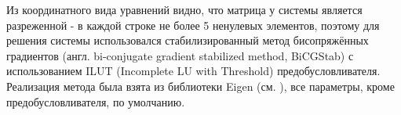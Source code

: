 Из координатного вида уравнений видно, что матрица у системы является разреженной - в каждой строке не более 5 ненулевых элементов, поэтому для решения системы использовался стабилизированный метод бисопряжённых градиентов (англ. bi-conjugate gradient stabilized method, BiCGStab) с использованием ILUT (Incomplete LU with Threshold) предобусловливателя.
Реализация метода была взята из библиотеки Eigen (см. \cite{Eigen}), все параметры, кроме предобусловливателя, по умолчанию.